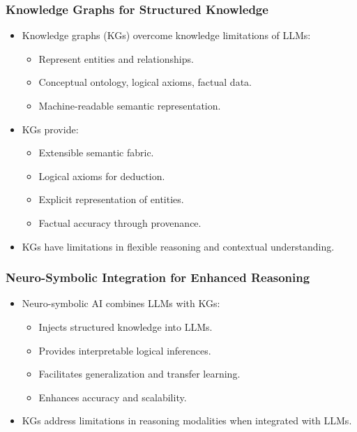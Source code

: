 \begin{frame}[fragile]\frametitle{Knowledge Graphs for Structured Knowledge}
    \begin{itemize}
        \item Knowledge graphs (KGs) overcome knowledge limitations of LLMs:
        \begin{itemize}
            \item Represent entities and relationships.
            \item Conceptual ontology, logical axioms, factual data.
            \item Machine-readable semantic representation.
        \end{itemize}
        \item KGs provide:
        \begin{itemize}
            \item Extensible semantic fabric.
            \item Logical axioms for deduction.
            \item Explicit representation of entities.
            \item Factual accuracy through provenance.
        \end{itemize}
        \item KGs have limitations in flexible reasoning and contextual understanding.
    \end{itemize}
\end{frame}

\begin{frame}[fragile]\frametitle{Neuro-Symbolic Integration for Enhanced Reasoning}
    \begin{itemize}
        \item Neuro-symbolic AI combines LLMs with KGs:
        \begin{itemize}
            \item Injects structured knowledge into LLMs.
            \item Provides interpretable logical inferences.
            \item Facilitates generalization and transfer learning.
            \item Enhances accuracy and scalability.
        \end{itemize}
        \item KGs address limitations in reasoning modalities when integrated with LLMs.
    \end{itemize}
\end{frame}

